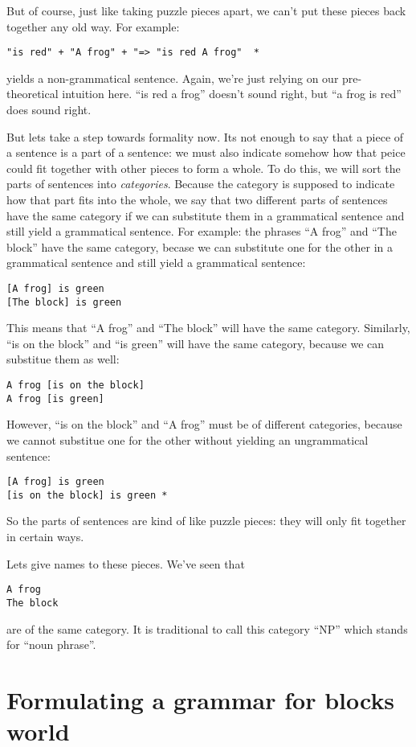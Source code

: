 \documentclass{book}[9pt]
\begin{document}
But of course, just like taking puzzle pieces apart, we can't put
these pieces back together any old way.  For example:
\begin{verbatim}
"is red" + "A frog" + "=> "is red A frog"  *
\end{verbatim}
\noindent yields a non-grammatical sentence.   Again, we're just
relying on our pre-theoretical intuition here.  ``is red a frog'' doesn't
sound right, but ``a frog is red'' does sound right.  

But lets take a step towards formality now.  Its not enough to say
that a piece of a sentence is a part of a sentence: we must also
indicate somehow how that peice could fit together with other pieces
to form a whole.  To do this, we will sort the parts of sentences into
{\em categories}.  Because the category is supposed to indicate how
that part fits into the whole, we say that two different parts of
sentences have the same category if we can substitute them in a
grammatical sentence and still yield a grammatical sentence.  For
example: the phrases ``A frog'' and ``The block'' have the same
category, becase we can substitute one for the other in a grammatical
sentence and still yield a grammatical sentence:
\begin{verbatim}
[A frog] is green
[The block] is green
\end{verbatim}
\noindent This means that ``A frog'' and ``The block'' will have the
same category.  Similarly, ``is on the block'' and ``is green'' will
have the same category, because we can substitue them as well:
\begin{verbatim}
A frog [is on the block]
A frog [is green]
\end{verbatim}
\noindent However, ``is on the block'' and ``A frog'' must be of
different categories, because we cannot substitue one for the other
without yielding an ungrammatical sentence:
\begin{verbatim}
[A frog] is green 
[is on the block] is green *
\end{verbatim}
\noindent So the parts of sentences are kind of like puzzle pieces:
they will only fit together in certain ways.

Lets give names to these pieces.  We've seen that 
\begin{verbatim}
A frog
The block
\end{verbatim}
\noindent are of the same category.  It is traditional to call this
category ``NP'' which stands for ``noun phrase''. 

\section{Formulating a grammar for blocks world}
\end{document}
